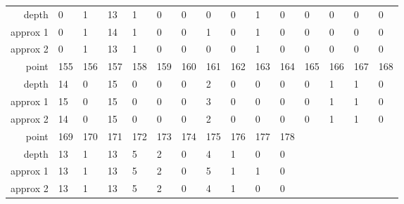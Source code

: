 \begin{center}
\begin{supertabular}{|r|l l l l l l l l l l l l l l|}
\hline
depth & 0 & 1 & 13 & 1 & 0 & 0 & 0 & 0 & 1 & 0 & 0 & 0 & 0 & 0 \\
approx 1 & 0 & 1 & 14 & 1 & 0 & 0 & 1 & 0 & 1 & 0 & 0 & 0 & 0 & 0 \\
approx 2 & 0 & 1 & 13 & 1 & 0 & 0 & 0 & 0 & 1 & 0 & 0 & 0 & 0 & 0 \\
\hline
point & 155 & 156 & 157 & 158 & 159 & 160 & 161 & 162 & 163 & 164 & 165 & 166 & 167 & 168 \\
\hline
depth & 14 & 0 & 15 & 0 & 0 & 0 & 2 & 0 & 0 & 0 & 0 & 1 & 1 & 0 \\
approx 1 & 15 & 0 & 15 & 0 & 0 & 0 & 3 & 0 & 0 & 0 & 0 & 1 & 1 & 0 \\
approx 2 & 14 & 0 & 15 & 0 & 0 & 0 & 2 & 0 & 0 & 0 & 0 & 1 & 1 & 0 \\
\hline
point & 169 & 170 & 171 & 172 & 173 & 174 & 175 & 176 & 177 & 178 & & & & \\
\hline
depth & 13 & 1 & 13 & 5 & 2 & 0 & 4 & 1 & 0 & 0 & & & & \\
approx 1 & 13 & 1 & 13 & 5 & 2 & 0 & 5 & 1 & 1 & 0 & & & & \\
approx 2 & 13 & 1 & 13 & 5 & 2 & 0 & 4 & 1 & 0 & 0 & & & & \\
\hline
  \end{supertabular}
  \label{tab:test.wine5d}
\end{center}



